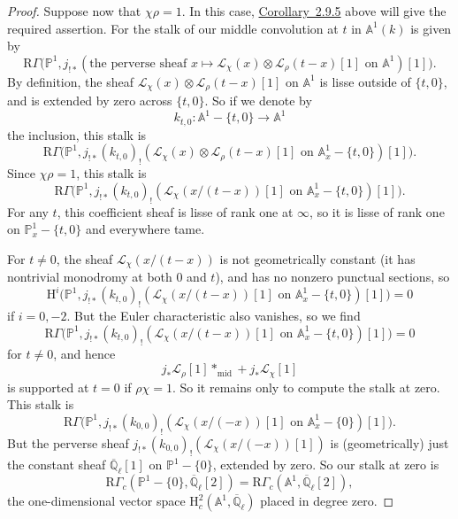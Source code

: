 \begin{proof}
Suppose now that \(\chi\rho=1\). In this case, \hyperref[cor:2.9.5]{Corollary~2.9.5} above will
give the required assertion. For the stalk of our middle convolution at \(t\)
in \(\mathbb{A}^1(k)\) is given by
\[
  \mathrm{R}\Gamma\bigl(\mathbb{P}^1,
  j_{!*}(\text{the perverse sheaf }
  x\mapsto\mathcal{L}_\chi(x)\otimes\mathcal{L}_\rho(t-x)[1]
  \text{ on }\mathbb{A}^1)[1]\bigr).
\]
By definition, the sheaf
\(\mathcal{L}_\chi(x)\otimes\mathcal{L}_\rho(t-x)[1]\) on \(\mathbb{A}^1\) is
lisse outside of \(\{t,0\}\), and is extended by zero across \(\{t,0\}\). So
if we denote by
\[
  k_{t,0}:\mathbb{A}^1-\{t,0\}\to\mathbb{A}^1
\]
the inclusion, this stalk is
\[
  \mathrm{R}\Gamma\bigl(\mathbb{P}^1,
  j_{!*}(k_{t,0})_!(\mathcal{L}_\chi(x)\otimes
  \mathcal{L}_\rho(t-x)[1]\text{ on }\mathbb{A}^1_x-\{t,0\})[1]\bigr).
\]
Since \(\chi\rho=1\), this stalk is
\[
  \mathrm{R}\Gamma\bigl(\mathbb{P}^1,
  j_{!*}(k_{t,0})_!(\mathcal{L}_\chi(x/(t-x))[1]
  \text{ on }\mathbb{A}^1_x-\{t,0\})[1]\bigr).
\]
For any \(t\), this coefficient sheaf is lisse of rank one at \(\infty\), so
it is lisse of rank one on \(\mathbb{P}^1_x-\{t,0\}\) and everywhere tame.

For \(t\neq 0\), the sheaf \(\mathcal{L}_\chi(x/(t-x))\) is not geometrically
constant (it has nontrivial monodromy at both \(0\) and \(t\)), and has no
nonzero punctual sections, so
\[
  \mathrm{H}^i\bigl(\mathbb{P}^1,
  j_{!*}(k_{t,0})_!(\mathcal{L}_\chi(x/(t-x))[1]
  \text{ on }\mathbb{A}^1_x-\{t,0\})[1]\bigr)=0
\]
if \(i=0,-2\). But the Euler characteristic also vanishes, so we find
\[
  \mathrm{R}\Gamma\bigl(\mathbb{P}^1,
  j_{!*}(k_{t,0})_!(\mathcal{L}_\chi(x/(t-x))[1]
  \text{ on }\mathbb{A}^1_x-\{t,0\})[1]\bigr)=0
\]
for \(t\neq 0\), and hence
\[
  j_*\mathcal{L}_\rho[1]*_{\mathrm{mid}}+j_*\mathcal{L}_\chi[1]
\]
is supported at \(t=0\) if \(\rho\chi=1\). So it remains only to compute the
stalk at zero. This stalk is
\[
  \mathrm{R}\Gamma\bigl(\mathbb{P}^1,
  j_{!*}(k_{0,0})_!(\mathcal{L}_\chi(x/(-x))[1]
  \text{ on }\mathbb{A}^1_x-\{0\})[1]\bigr).
\]
But the perverse sheaf
\(j_{!*}(k_{0,0})_!(\mathcal{L}_\chi(x/(-x))[1])\) is (geometrically) just
the constant sheaf \(\overline{\mathbb{Q}}_\ell[1]\) on
\(\mathbb{P}^1-\{0\}\), extended by zero. So our stalk at zero is
\[
  \mathrm{R}\Gamma_c(\mathbb{P}^1-\{0\},\overline{\mathbb{Q}}_\ell[2])
  =
  \mathrm{R}\Gamma_c(\mathbb{A}^1,\overline{\mathbb{Q}}_\ell[2]),
\]
the one-dimensional vector space
\(\mathrm{H}^2_c(\mathbb{A}^1,\overline{\mathbb{Q}}_\ell)\) placed in degree
zero.
\end{proof}

